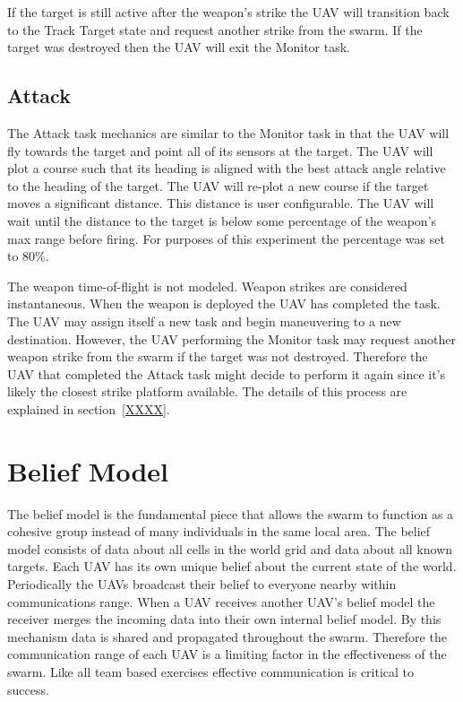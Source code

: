 If the target is still active after the weapon's strike the UAV will transition back to the Track Target state and request another strike from the swarm.  If the target was destroyed then the UAV will exit the Monitor task.


\subsection{Attack}
The Attack task mechanics are similar to the Monitor task in that the UAV will fly towards the target and point all of its sensors at the target.  The UAV will plot a course such that its heading is aligned with the best attack angle relative to the heading of the target.  The UAV will re-plot a new course if the target moves a significant distance.  This distance is user configurable.  The UAV will wait until the distance to the target is below some percentage of the weapon's max range before firing.  For purposes of this experiment the percentage was set to 80\%.

The weapon time-of-flight is not modeled.  Weapon strikes are considered instantaneous.  When the weapon is deployed the UAV has completed the task.  The UAV may assign itself a new task and begin maneuvering to a new destination.  However, the UAV performing the Monitor task may request another weapon strike from the swarm if the target was not destroyed.  Therefore the UAV that completed the Attack task might decide to perform it again since it's likely the closest strike platform available.  The details of this process are explained in section~\ref{XXXX}. 


\section{Belief Model}
\label{sec:uavBelief}
The belief model is the fundamental piece that allows the swarm to function as a cohesive group instead of many individuals in the same local area.  The belief model consists of data about all cells in the world grid and data about all known targets.  Each UAV has its own unique belief about the current state of the world.  Periodically the UAVs broadcast their belief to everyone nearby within communications range.  When a UAV receives another UAV's belief model the receiver merges the incoming data into their own internal belief model.  By this mechanism data is shared and propagated throughout the swarm.  Therefore the communication range of each UAV is a limiting factor in the effectiveness of the swarm.  Like all team based exercises effective communication is critical to success.  

